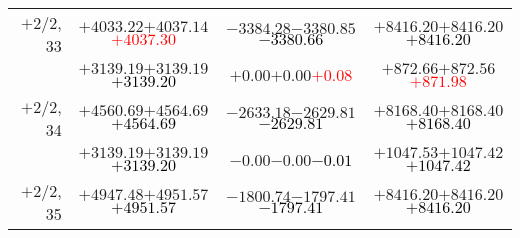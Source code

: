 \documentclass[compress]{beamer}
\begin{document}
\begin{frame}
{\begin{tabular}{r | c | c | c}
$+$2/2, 33 & $+4033.22$\hspace{0.1 cm}$+4037.14$\hspace{0.1 cm}\textcolor{red}{$+4037.30$} & $-3384.28$\hspace{0.1 cm}$-3380.85$\hspace{0.1 cm}\textcolor{black}{$-3380.66$} & $+8416.20$\hspace{0.1 cm}$+8416.20$\hspace{0.1 cm}\textcolor{black}{$+8416.20$} \\
           & $+3139.19$\hspace{0.1 cm}$+3139.19$\hspace{0.1 cm}\textcolor{black}{$+3139.20$} & $+0.00$\hspace{0.1 cm}$+0.00$\hspace{0.1 cm}\textcolor{red}{$+0.08$} & $+872.66$\hspace{0.1 cm}$+872.56$\hspace{0.1 cm}\textcolor{red}{$+871.98$} \\
$+$2/2, 34 & $+4560.69$\hspace{0.1 cm}$+4564.69$\hspace{0.1 cm}\textcolor{black}{$+4564.69$} & $-2633.18$\hspace{0.1 cm}$-2629.81$\hspace{0.1 cm}\textcolor{black}{$-2629.81$} & $+8168.40$\hspace{0.1 cm}$+8168.40$\hspace{0.1 cm}\textcolor{black}{$+8168.40$} \\
           & $+3139.19$\hspace{0.1 cm}$+3139.19$\hspace{0.1 cm}\textcolor{black}{$+3139.20$} & $-0.00$\hspace{0.1 cm}$-0.00$\hspace{0.1 cm}\textcolor{black}{$-0.01$} & $+1047.53$\hspace{0.1 cm}$+1047.42$\hspace{0.1 cm}\textcolor{black}{$+1047.42$} \\
$+$2/2, 35 & $+4947.48$\hspace{0.1 cm}$+4951.57$\hspace{0.1 cm}\textcolor{black}{$+4951.57$} & $-1800.74$\hspace{0.1 cm}$-1797.41$\hspace{0.1 cm}\textcolor{black}{$-1797.41$} & $+8416.20$\hspace{0.1 cm}$+8416.20$\hspace{0.1 cm}\textcolor{black}{$+8416.20$} \\

\end{tabular}}
\end{frame}
\end{document}
